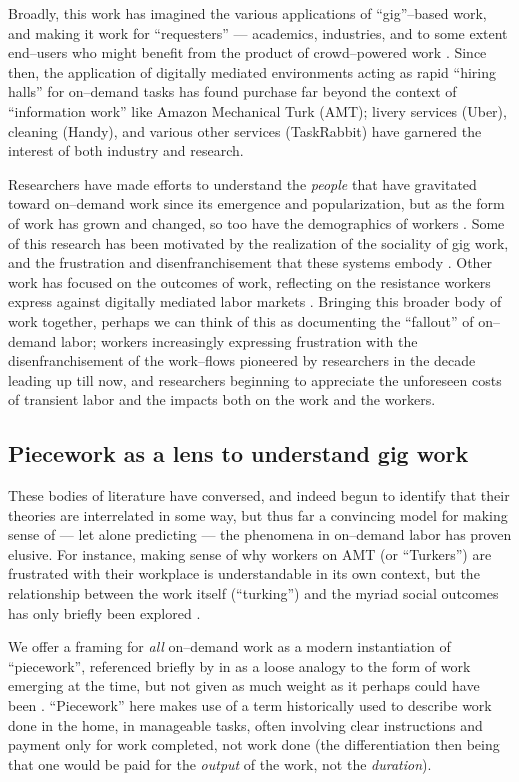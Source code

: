 \documentclass[trackingWork]{subfiles}
\begin{document}
Broadly, this work has imagined the various applications of ``gig''--based work,
and making it work for ``requesters''
--- academics, industries, and to some extent end--users
who might benefit from the product of crowd--powered work
\cite{hong2015group,jonBrelig,paolacci2010running}.
Since then,
the application of digitally mediated environments acting as rapid ``hiring halls''
for on--demand tasks
has found purchase far beyond the context of ``information work'' like Amazon Mechanical Turk (AMT);
livery services (Uber), cleaning (Handy), and various other services (TaskRabbit)
have garnered the interest of both industry and research.

Researchers have made efforts to understand the \textit{people} that have gravitated toward on--demand work
since its emergence and popularization,
but as the form of work has grown and changed, so too have the demographics of workers
\cite{Ross,whoareNOTtheTurkers}.
Some of this research has been motivated by the realization of the sociality of gig work,
and the frustration and disenfranchisement that these systems embody
\cite{turkopticon,dynamo}.
Other work has focused on the outcomes of work,
reflecting on the resistance workers express against digitally mediated labor markets
\cite{uberAlgorithm}.
Bringing this broader body of work together, perhaps we can think of this as documenting the ``fallout'' of on--demand labor;
workers increasingly expressing frustration with the disenfranchisement of the work--flows pioneered by researchers in the decade leading up till now,
and researchers beginning to appreciate the unforeseen costs of transient labor and the impacts both on the work and the workers.

\subsection{Piecework as a lens to understand gig work}
These bodies of literature have conversed,
and indeed begun to identify that their theories are interrelated in some way,
but thus far a convincing model for making sense of
--- let alone predicting ---
the phenomena in on--demand labor has proven elusive.
For instance, 
making sense of why workers on AMT (or ``Turkers'') are frustrated with their workplace
is understandable in its own context, but
the relationship between the work itself (``turking'')
and the myriad social outcomes has only briefly been explored
\cite{crowdcollab}.

We offer a framing for \textit{all} on--demand work as a modern instantiation of ``piecework'',
referenced briefly by
\citeauthor{crowdworkFuture}
in
\citeyear{crowdworkFuture}
as a loose analogy to the form of work emerging at the time,
but not given as much weight as it perhaps could have been
\cite{crowdworkFuture}.
``Piecework'' here makes use of
a term historically used to describe work done in the home,
in manageable tasks,
often involving clear instructions
and payment only for work completed, not work done
(the differentiation then being that
one would be paid for the \textit{output} of the work,
not the \textit{duration}).
\end{document}
